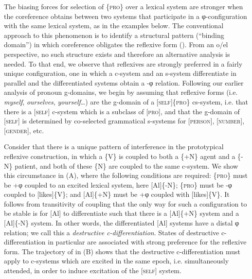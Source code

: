   The biasing forces for selection of \{\textsc{pro}\} over a lexical system are stronger when the coreference obtains between two systems that participate in a φ-configuration with the same lexical system, as in the examples below. The conventional approach to this phenomenon is to identify a structural pattern (“binding domain”) in which coreference obligates the reflexive form (\citealt{Chomsky1982,Chomsky1993,Haegeman1994,Reinhart1976,Safir2004}). From an o/el perspective, no such structure exists and therefore an alternative analysis is needed. To that end, we observe that reflexives are strongly preferred in a fairly unique configuration, one in which a c-system and an s-system differentiate in parallel and the differentiated systems obtain a -φ relation. Following our earlier analysis of pronoun g-domains, we begin by assuming that reflexive forms (i.e. \textit{myself}, \textit{ourselves}, \textit{yourself}…) are the g-domain of a [\textsc{self}]\{\textsc{pro}\} cs-system, i.e. that there is a [\textsc{self}] c-system which is a subclass of [\textsc{pro}], and that the g-domain of [\textsc{self}] is determined by co-selected grammatical s-systems for [\textsc{person}], [\textsc{number}], [\textsc{gender}], etc. 

\ea\label{ex:7:14}
 \label{ex:7:14a}     
 \label{ex:7:14b}       
\z
\z

  Consider that there is a unique pattern of interference in the prototypical reflexive construction, in which a \{V\} is coupled to both a \{+N\} agent and a \{-N\} patient, and both of these \{N\} are coupled to the same c-system. We show this circumstance in {}(A), where the following conditions are required: \{\textsc{pro}\} must be +φ coupled to an excited lexical system, here [Al]\{-N\}; \{\textsc{pro}\} must be -φ coupled to [likes]\{V\}; and [Al]\{+N\} must be +φ coupled with [likes]\{V\}. It follows from transitivity of coupling that the only way for such a configuration to be stable is for [Al] to differentiate such that there is a [Al]\{+N\} system and a [Al]\{-N\} system. In other words, the differentiated [Al] systems have a distal φ relation; we call this a \textit{destructive c-differentiation}. States of destructive c-differentiation in particular are associated with strong preference for the reflexive form. The trajectory of  in {}(B) shows that the destructive c-differentiation must apply to c-systems which are excited in the same epoch, i.e. simultaneously attended, in order to induce excitation of the [\textsc{self}] system. 

